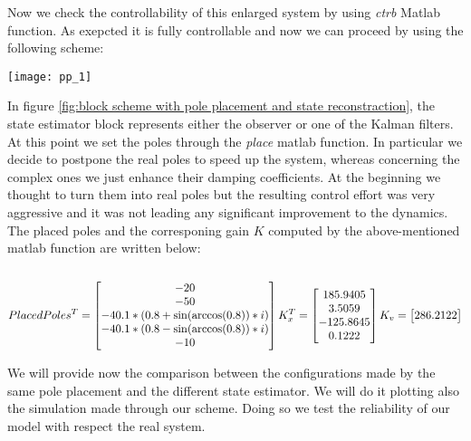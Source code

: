 Now we check the controllability of this enlarged system by using \textit{ctrb} Matlab function.
As exepcted it is fully controllable and now we can proceed by using the following scheme:
\begin{figure*}[h]
	\centering
	\texttt{[image: pp\_1]}
	\caption{block scheme with pole placement and state reconstraction}
	\label{fig:block scheme with pole placement and state reconstraction}
\end{figure*}

\newpage

In figure \ref{fig:block scheme with pole placement and state reconstraction}, the state estimator block represents either the observer or one of the Kalman filters. 
At this point we set the poles through the \textit{place} matlab function. In particular we decide to postpone the real poles to speed up the system, whereas concerning the complex ones we just enhance their damping coefficients. At the beginning we thought to turn them into real poles but the resulting control effort was very aggressive and it was not leading any significant improvement to the dynamics. The placed poles and the corresponing gain $K$ computed by the above-mentioned matlab function are written below:
\\\\

\begin{equation}
	PlacedPoles^{T} =
	\begin{bmatrix}
		-20 \\ -50 \\ -40.1*(0.8+\sin(\arccos(0.8))*i) \\ -40.1*(0.8-\sin(\arccos(0.8))*i) \\-10  
	\end{bmatrix}
		K_x^{T} =
	\begin{bmatrix}
		185.9405 \\  3.5059 \\ -125.8645 \\   0.1222
	\end{bmatrix}
	\\
	K_v =
	\begin{bmatrix}
		286.2122
	\end{bmatrix}
\end{equation}

We will provide now the comparison between the configurations made by the same pole placement and the different state estimator. We will do it plotting also the simulation made through our scheme. Doing so we test the reliability of our model with respect the real system.

